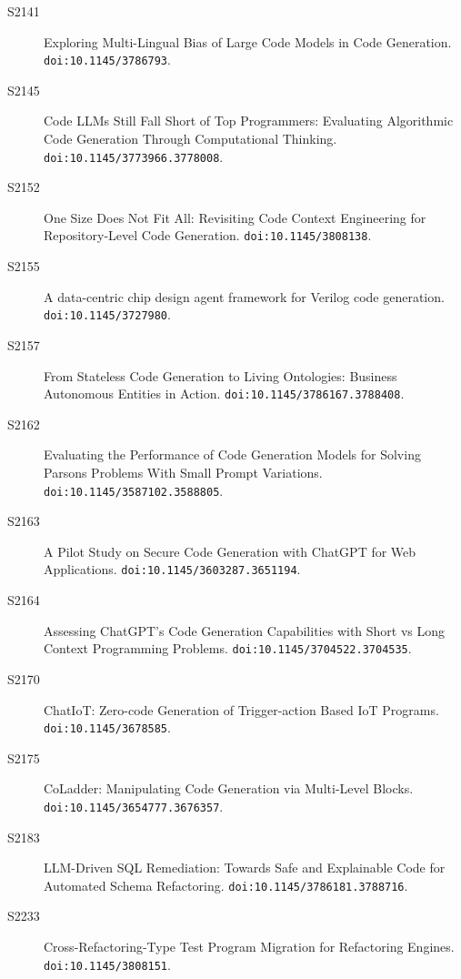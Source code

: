 {\begin{description}
\item[S2141] Exploring Multi-Lingual Bias of Large Code Models in Code Generation. \texttt{doi:10.1145/3786793}.
\item[S2145] Code LLMs Still Fall Short of Top Programmers: Evaluating Algorithmic Code Generation Through Computational Thinking. \texttt{doi:10.1145/3773966.3778008}.
\item[S2152] One Size Does Not Fit All: Revisiting Code Context Engineering for Repository-Level Code Generation. \texttt{doi:10.1145/3808138}.
\item[S2155] A data-centric chip design agent framework for Verilog code generation. \texttt{doi:10.1145/3727980}.
\item[S2157] From Stateless Code Generation to Living Ontologies: Business Autonomous Entities in Action. \texttt{doi:10.1145/3786167.3788408}.
\item[S2162] Evaluating the Performance of Code Generation Models for Solving Parsons Problems With Small Prompt Variations. \texttt{doi:10.1145/3587102.3588805}.
\item[S2163] A Pilot Study on Secure Code Generation with ChatGPT for Web Applications. \texttt{doi:10.1145/3603287.3651194}.
\item[S2164] Assessing ChatGPT’s Code Generation Capabilities with Short vs Long Context Programming Problems. \texttt{doi:10.1145/3704522.3704535}.
\item[S2170] ChatIoT: Zero-code Generation of Trigger-action Based IoT Programs. \texttt{doi:10.1145/3678585}.
\item[S2175] CoLadder: Manipulating Code Generation via Multi-Level Blocks. \texttt{doi:10.1145/3654777.3676357}.
\item[S2183] LLM-Driven SQL Remediation: Towards Safe and Explainable Code for Automated Schema Refactoring. \texttt{doi:10.1145/3786181.3788716}.
\item[S2233] Cross-Refactoring-Type Test Program Migration for Refactoring Engines. \texttt{doi:10.1145/3808151}.
\end{description}
}
